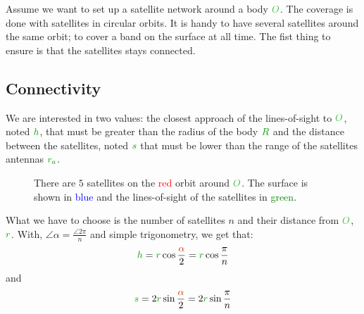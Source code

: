 Assume we want to set up a satellite network around a body
$\posit{O}$. The coverage is done with satellites in circular orbits. It
is handy to have several satellites around the same orbit; to cover a
band on the surface at all time. The fist thing to ensure is that the
satellites stays connected.

\subsection{Connectivity}

We are interested in two values: the closest approach of the
lines-of-sight to $\posit{O}$, noted $\dist{h}$, that must be greater
than the radius of the body $\dist{R}$ and the distance between the
satellites, noted $\dist{s}$ that must be lower than the range of the
satellites antennas $\dist{r_a}$.

\begin{figure}[H]
	\centering
	\def\n{5}
	\caption{
		There are $\n$ satellites on the \textcolor{red}{red}
		orbit around $\posit{O}$. The surface is shown in
		\textcolor{blue}{blue} and the lines-of-sight of the
		satellites in \textcolor{green}{green}.
	}
\end{figure}

What we have to choose is the number of satellites $n$ and their
distance from $\posit{O}$, $\dist{r}$. With, $\angle{\alpha} = \frac
{\angle{2\pi}} n$ and simple trigonometry, we get that:
\[
\dist{h}
= \dist{r} \cos \frac {\angle{\alpha}} 2
= \dist{r} \cos \frac {\pi} n
\]
and
\[
\dist{s}
= 2 \dist{r} \sin \frac {\angle{\alpha}} 2
= 2 \dist{r} \sin \frac {\pi} n
\]

